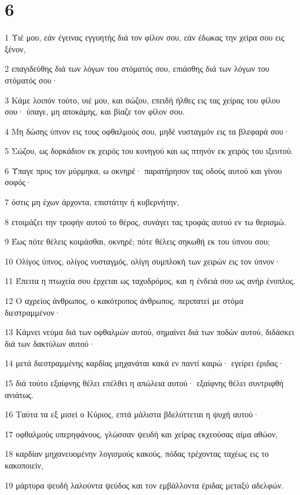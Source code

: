 \chapter{6}

\par 1 Υιέ μου, εάν έγεινας εγγυητής διά τον φίλον σου, εάν έδωκας την χείρα σου εις ξένον,
\par 2 επαγιδεύθης διά των λόγων του στόματός σου, επιάσθης διά των λόγων του στόματός σου·
\par 3 Κάμε λοιπόν τούτο, υιέ μου, και σώζου, επειδή ήλθες εις τας χείρας του φίλου σου· ύπαγε, μη αποκάμης, και βίαζε τον φίλον σου.
\par 4 Μη δώσης ύπνον εις τους οφθαλμούς σου, μηδέ νυσταγμόν εις τα βλεφαρά σου·
\par 5 Σώζου, ως δορκάδιον εκ χειρός του κυνηγού και ως πτηνόν εκ χειρός του ιξευτού.
\par 6 Ύπαγε προς τον μύρμηκα, ω οκνηρέ· παρατήρησον τας οδούς αυτού και γίνου σοφός·
\par 7 όστις μη έχων άρχοντα, επιστάτην ή κυβερνήτην,
\par 8 ετοιμάζει την τροφήν αυτού το θέρος, συνάγει τας τροφάς αυτού εν τω θερισμώ.
\par 9 Έως πότε θέλεις κοιμάσθαι, οκνηρέ; πότε θέλεις σηκωθή εκ του ύπνου σου;
\par 10 Ολίγος ύπνος, ολίγος νυσταγμός, ολίγη συμπλοκή των χειρών εις τον ύπνον·
\par 11 Έπειτα η πτωχεία σου έρχεται ως ταχυδρόμος, και η ένδειά σου ως ανήρ ένοπλος.
\par 12 Ο αχρείος άνθρωπος, ο κακότροπος άνθρωπος, περιπατεί με στόμα διεστραμμένον·
\par 13 Κάμνει νεύμα διά των οφθαλμών αυτού, σημαίνει διά των ποδών αυτού, διδάσκει διά των δακτύλων αυτού·
\par 14 μετά διεστραμμένης καρδίας μηχανάται κακά εν παντί καιρώ· εγείρει έριδας·
\par 15 διά τούτο εξαίφνης θέλει επέλθει η απώλεια αυτού· εξαίφνης θέλει συντριφθή ανιάτως.
\par 16 Ταύτα τα εξ μισεί ο Κύριος, επτά μάλιστα βδελύττεται η ψυχή αυτού·
\par 17 οφθαλμούς υπερηφάνους, γλώσσαν ψευδή και χείρας εκχεούσας αίμα αθώον,
\par 18 καρδίαν μηχανευομένην λογισμούς κακούς, πόδας τρέχοντας ταχέως εις το κακοποιείν,
\par 19 μάρτυρα ψευδή λαλούντα ψεύδος και τον εμβάλλοντα έριδας μεταξύ αδελφών.
